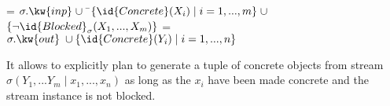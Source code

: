 \documentclass[letterpaper]{article} %
\theoremstyle{plain}\newtheorem{thm}{Theorem}
\theoremstyle{definition}\newtheorem{defn}{Definition}
\theoremstyle{plain}\newtheorem{lem}{Lemma}
\theoremstyle{plain}\newtheorem{cor}{Corollary}
\begin{document}
\begin{footnotesize}
\begin{codebox}

\zi {} = $\sigma.\kw{inp} \;\cup\;$ \=$\{\id{Concrete}(X_i) \mid i = 1,
..., m\}\; \cup$ 
\zi\>$\{\neg \id{Blocked}_\sigma(X_1, ..., X_m)\}$
\zi {} = $\sigma.\kw{out} \;\cup \{\id{Concrete}(Y_i) \mid i = 1, ..., n\}$
\end{codebox}
\end{footnotesize}

\noindent
It allows  to explicitly plan to generate a tuple of
concrete objects from stream $\sigma(Y_1, ... Y_m \mid x_1, ..., x_n)$
as long as the $x_i$ have been made concrete and the stream instance
is not blocked.  



\end{document}
